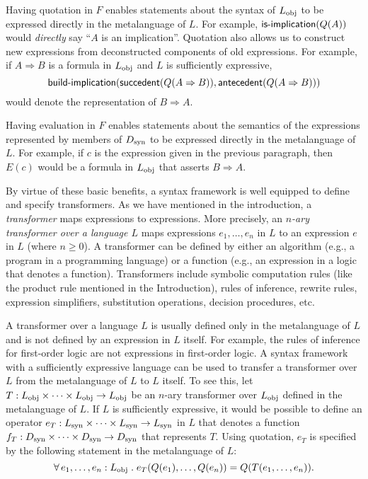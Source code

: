 \documentclass[11pt,fleqn]{article}
\newcommand{\bsp}{\begin{sloppypar}}
\newcommand{\esp}{\end{sloppypar}}
\newcommand{\mname}[1]{\mbox{\sf #1}}
\newcommand{\mcolon}{\mathrel:}
\newcommand{\mdot}{\mathrel.}
\newcommand{\tarrow}{\rightarrow}
\newcommand{\ImpliesAlt}{\Rightarrow}
\newcommand{\ForallApp}{\forall\,}
\begin{document}
\bsp Having quotation in $F$ enables statements about the syntax of
$L_{\rm obj}$ to be expressed directly in the metalanguage of $L$.
For example, $\mname{is-implication}(Q(A))$ would \emph{directly} say
``$A$ is an implication''.  Quotation also allows us to construct new
expressions from deconstructed components of old expressions.  For
example, if $A \ImpliesAlt B$ is a formula in $L_{\rm obj}$ and $L$ is
sufficiently expressive,
\[\mname{build-implication}(\mname{succedent}(Q(A \ImpliesAlt
B)),\mname{antecedent}(Q(A \ImpliesAlt B)))\] would denote the
representation of $B \ImpliesAlt A$. \esp

Having evaluation in $F$ enables statements about the semantics of the
expressions represented by members of $D_{\rm syn}$ to be expressed
directly in the metalanguage of $L$.  For example, if $c$ is the
expression given in the previous paragraph, then $E(c)$ would be a
formula in $L_{\rm obj}$ that asserts $B \ImpliesAlt A$.

By virtue of these basic benefits, a syntax framework is well equipped
to define and specify transformers.  As we have mentioned in the
introduction, a \emph{transformer} maps expressions to expressions.
More precisely, an \emph{$n$-ary transformer over a language $L$} maps
expressions $e_1,\ldots,e_n$ in $L$ to an expression $e$ in $L$ (where
$n \ge 0$).  A transformer can be defined by either an algorithm
(e.g., a program in a programming language) or a function (e.g., an
expression in a logic that denotes a function).  Transformers include
symbolic computation rules (like the product rule mentioned in the
Introduction), rules of inference, rewrite rules, expression
simplifiers, substitution operations, decision procedures, etc.

A transformer over a language $L$ is usually defined only in the
metalanguage of $L$ and is not defined by an expression in $L$ itself.
For example, the rules of inference for first-order logic are not
expressions in first-order logic.  A syntax framework with a
sufficiently expressive language can be used to transfer a transformer
over $L$ from the metalanguage of $L$ to $L$ itself.  To see this, let
$T : L_{\rm obj} \times \cdots \times L_{\rm obj} \tarrow L_{\rm obj}$
be an $n$-ary transformer over $L_{\rm obj}$ defined in the
metalanguage of $L$.  If $L$ is sufficiently expressive, it would be
possible to define an operator $e_T : L_{\rm syn} \times \cdots \times
L_{\rm syn} \tarrow L_{\rm syn}$ in $L$ that denotes a function $f_T :
D_{\rm syn} \times \cdots \times D_{\rm syn} \tarrow D_{\rm syn}$ that
represents $T$.  Using quotation, $e_T$ is specified by the following
statement in the metalanguage of $L$: \[\ForallApp e_1,\ldots,e_n
\mcolon L_{\rm obj} \mdot e_T(Q(e_1),\ldots,Q(e_n)) =
Q(T(e_1,\ldots,e_n)).\]
\end{document}
